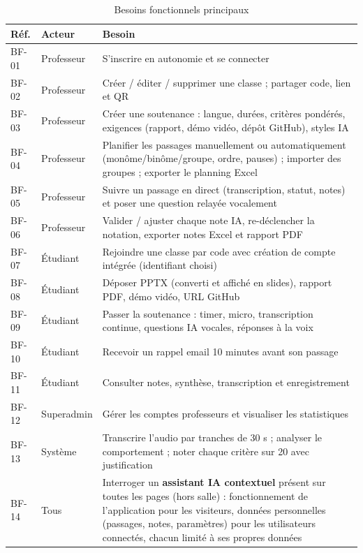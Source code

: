\documentclass[12pt,a4paper]{report}
\begin{document}
\begin{table}[H]
\centering\small
\begin{tabular}{llp{10.3cm}}
\toprule
\textbf{Réf.} & \textbf{Acteur} & \textbf{Besoin} \\
\midrule
BF-01 & Professeur & S'inscrire en autonomie et se connecter \\
BF-02 & Professeur & Créer / éditer / supprimer une classe ; partager code, lien et QR \\
BF-03 & Professeur & Créer une soutenance : langue, durées, critères pondérés, exigences (rapport, démo vidéo, dépôt GitHub), styles IA \\
BF-04 & Professeur & Planifier les passages manuellement ou automatiquement (monôme/binôme/groupe, ordre, pauses) ; importer des groupes ; exporter le planning Excel \\
BF-05 & Professeur & Suivre un passage en direct (transcription, statut, notes) et poser une question relayée vocalement \\
BF-06 & Professeur & Valider / ajuster chaque note IA, re-déclencher la notation, exporter notes Excel et rapport PDF \\
BF-07 & Étudiant & Rejoindre une classe par code avec création de compte intégrée (identifiant choisi) \\
BF-08 & Étudiant & Déposer PPTX (converti et affiché en slides), rapport PDF, démo vidéo, URL GitHub \\
BF-09 & Étudiant & Passer la soutenance : timer, micro, transcription continue, questions IA vocales, réponses à la voix \\
BF-10 & Étudiant & Recevoir un rappel email 10 minutes avant son passage \\
BF-11 & Étudiant & Consulter notes, synthèse, transcription et enregistrement \\
BF-12 & Superadmin & Gérer les comptes professeurs et visualiser les statistiques \\
BF-13 & Système & Transcrire l'audio par tranches de 30 s ; analyser le comportement ; noter chaque critère sur 20 avec justification \\
BF-14 & Tous & Interroger un \textbf{assistant IA contextuel} présent sur toutes les pages (hors salle) : fonctionnement de l'application pour les visiteurs, données personnelles (passages, notes, paramètres) pour les utilisateurs connectés, chacun limité à ses propres données \\
\bottomrule
\end{tabular}
\caption{Besoins fonctionnels principaux}
\end{table}
\end{document}

